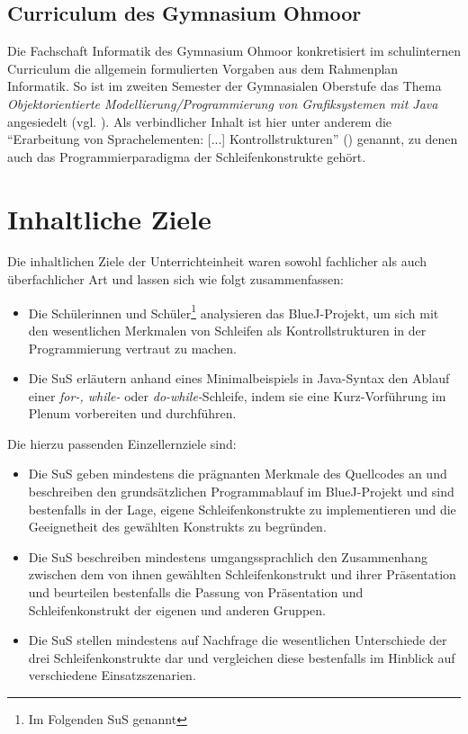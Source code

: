 \documentclass[paper=a4, DIV=13, BCOR=8mm, oneside=on, onecolumn=on, open = any, titlepage =on, parskip =half-, headsepline = on, footsepline = off, chapterprefix = on, sectionprefix = on, appendixprefix = off, fontsize = 12pt, numbers = noenddot, abstract = off]{scrreprt}
\begin{document}
\par \singlespacing
\subsection{Curriculum des Gymnasium Ohmoor}
\onehalfspacing
Die Fachschaft Informatik des Gymnasium Ohmoor konkretisiert im schulinternen Curriculum die allgemein formulierten Vorgaben aus dem Rahmenplan Informatik. So ist im zweiten Semester der Gymnasialen Oberstufe das Thema \textit{Objektorientierte Modellierung/Programmierung von Grafiksystemen mit Java} angesiedelt (vgl. \cite[S.6f.]{ohmoor:16}). Als verbindlicher Inhalt ist hier unter anderem die "`Erarbeitung von Sprachelementen: [...] Kontrollstrukturen"' (\cite[S.7]{ohmoor:16}) genannt, zu denen auch das Programmierparadigma der Schleifenkonstrukte gehört.

\par \singlespacing
 \section{Inhaltliche Ziele}
\onehalfspacing
Die inhaltlichen Ziele der Unterrichteinheit waren sowohl fachlicher als auch überfachlicher Art und lassen sich wie folgt zusammenfassen:
\begin{itemize}
\item Die Schülerinnen und Schüler\footnote{Im Folgenden SuS genannt} analysieren das BlueJ-Projekt, um sich mit den wesentlichen Merkmalen von Schleifen als Kontrollstrukturen in der Programmierung vertraut zu machen.
\item Die SuS erläutern anhand eines Minimalbeispiels in Java-Syntax den Ablauf einer \emph{for-, while-} oder \emph{do-while-}Schleife, indem sie eine Kurz-Vorführung im Plenum vorbereiten und durchführen.
\end{itemize}
Die hierzu passenden Einzellernziele sind:
\begin{itemize}
\item Die SuS geben mindestens die prägnanten Merkmale des Quellcodes an und beschreiben den grundsätzlichen Programmablauf im BlueJ-Projekt und sind bestenfalls in der Lage, eigene Schleifenkonstrukte zu implementieren und die Geeignetheit des gewählten Konstrukts zu begründen.
\item Die SuS beschreiben mindestens umgangssprachlich den Zusammenhang zwischen dem von ihnen gewählten Schleifenkonstrukt und ihrer Präsentation und beurteilen bestenfalls die Passung von Präsentation und Schleifenkonstrukt der eigenen und anderen Gruppen.
\item Die SuS stellen mindestens auf Nachfrage die wesentlichen Unterschiede der drei Schleifenkonstrukte dar und vergleichen diese bestenfalls im Hinblick auf verschiedene Einsatzszenarien.
\end{itemize}
\end{document}
